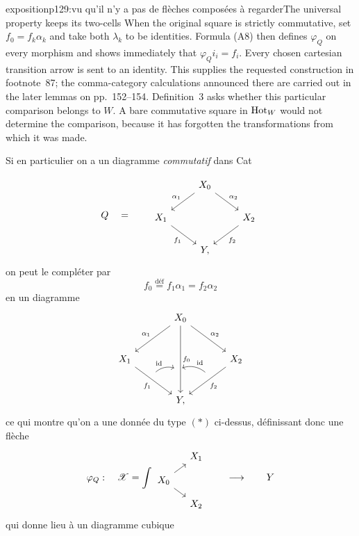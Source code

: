 \begin{dcomment}{exposition}{p129:vu qu'il n'y a pas de flèches composées à regarder}{The universal property keeps its two-cells}
When the original square is strictly commutative, set $f_0=f_k\alpha_k$ and take both $\lambda_k$ to be identities.  Formula (A8) then defines $\varphi_Q$ on every morphism and shows immediately that $\varphi_Qi_i=f_i$.  Every chosen cartesian transition arrow is sent to an identity.  This supplies the requested construction in footnote~87; the comma-category calculations announced there are carried out in the later lemmas on pp.~152--154.  Definition~3 asks whether this particular comparison belongs to $W$.  A bare commutative square in $\mathrm{Hot}_W$ would not determine the comparison, because it has forgotten the transformations from which it was made.
\end{dcomment}


Si en particulier on a un diagramme \textit{commutatif} dans Cat

\[
Q \quad = \qquad
\begin{tikzcd}
 & X_0 \arrow[dl, "\alpha_1"'] \arrow[dr, "\alpha_2"] & \\
X_1 \arrow[dr, "f_1"'] & & X_2 \arrow[dl, "f_2"] \\
 & Y, &
\end{tikzcd}
\]
on peut le compléter par
\[
f_0 \overset{\text{déf}}{=} f_1\alpha_1 = f_2\alpha_2
\]
en un diagramme
\[
\begin{tikzcd}[row sep=large, column sep=large]
 & X_0 \arrow[dl, "\alpha_1"'] \arrow[dr, "\alpha_2"] \arrow[dd, "f_0", ""'{name=F0, pos=0.65}] & \\
X_1 \arrow[dr, "f_1"', ""{name=F1, pos=0.4}] & & X_2 \arrow[dl, "f_2", ""'{name=F2, pos=0.4}] \\
 & Y, &
\arrow[from=F1, to=F0, bend left, "\mathrm{id}", shorten <=2pt, shorten >=2pt]
\arrow[from=F2, to=F0, bend right, "\mathrm{id}"', shorten <=2pt, shorten >=2pt]
\end{tikzcd}
\]
ce qui montre qu'on a une donnée du type $(*)$ ci-dessus, définissant donc une flèche
\[
\varphi_Q : \quad \sX = \int
\begin{tikzcd}[row sep=small, column sep=small]
 & X_1 \\
X_0 \arrow[ur] \arrow[dr] & \\
 & X_2
\end{tikzcd}
\qquad \longrightarrow \qquad Y
\]
qui donne lieu à un diagramme cubique

